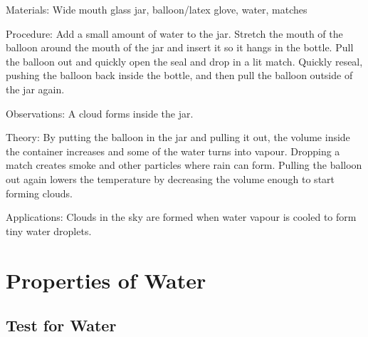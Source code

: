 \begin{multicols}{2}

\begin{description*}
\item[Materials:]{Wide mouth glass jar, balloon/latex glove, water, matches}
\item[Procedure:]{Add a small amount of water to the jar. Stretch the mouth of the balloon around the mouth of the jar and insert it so it hangs in the bottle. Pull the balloon out and quickly open the seal and drop in a lit match. Quickly reseal, pushing the balloon back inside the bottle, and then pull the balloon outside of the jar again.}
\item[Observations:]{A cloud forms inside the jar.}
\item[Theory:]{By putting the balloon in the jar and pulling it out, the volume inside the container increases and some of the water turns into vapour. Dropping a match creates smoke and other particles where rain can form. Pulling the balloon out again lowers the temperature by decreasing the volume enough to start forming clouds.}
\item[Applications:]{Clouds in the sky are formed when water vapour is cooled to form tiny water droplets.}
\end{description*}


\section*{Properties of Water} 


\subsection{Test for Water} %



\end{multicols}
